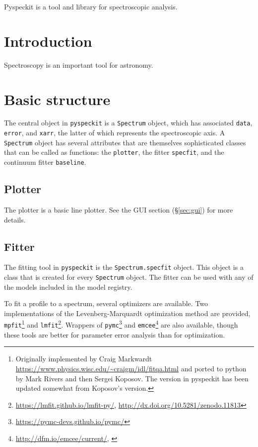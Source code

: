 \documentclass[twocolumn]{aastex61}
\newcommand{\pyspeckit}{\texttt{pyspeckit}\xspace}
\begin{document}
Pyspeckit is a tool and library for spectroscopic analysis. 


\section{Introduction}
Spectroscopy is an important tool for astronomy.

\section{Basic structure}
The central object in \pyspeckit is a \texttt{Spectrum} object, which has
associated \texttt{data}, \texttt{error}, and \texttt{xarr}, the latter of
which represents the spectroscopic axis.  A \texttt{Spectrum} object has
several attributes that are themselves sophisticated classes that can be called
as functions: the \texttt{plotter}, the fitter \texttt{specfit}, and the
continuum fitter \texttt{baseline}.

\subsection{Plotter}
The plotter is a basic line plotter.  See the GUI section (\S \ref{sec:gui})
for more details.

\subsection{Fitter}
The fitting tool in \pyspeckit is the \texttt{Spectrum.specfit} object.
This object is a class that is created for every \texttt{Spectrum} object.
The fitter can be used with any of the models included in the model
registry.

To fit a profile to a spectrum, several optimizers are available.  Two
implementations of the Levenberg-Marquardt optimization method are provided,
\texttt{mpfit}\footnote{Originally implemented by Craig Markwardt
\url{https://www.physics.wisc.edu/~craigm/idl/fitqa.html} and ported to python
by Mark Rivers and then Sergei Koposov.  The version in pyspeckit has been
updated somewhat from Koposov's version.} and
\texttt{lmfit}\footnote{\url{https://lmfit.github.io/lmfit-py/},
\url{http://dx.doi.org/10.5281/zenodo.11813}}.  Wrappers of
\texttt{pymc}\footnote{\url{https://pymc-devs.github.io/pymc/}} and
\texttt{emcee}\footnote{\url{http://dfm.io/emcee/current/},
\citet{Foreman-Mackey2013a}} are also available, though these tools are better
for parameter error analysis than for optimization.
\end{document}
